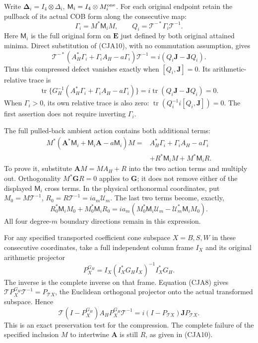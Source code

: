 \documentclass[11pt,a4paper]{article}
\begin{document}
Write \(\boldsymbol\Delta_i=I_4\otimes\Delta_i\),
\(\mathsf M_i=I_4\otimes M_i^{\rm one}\).
For each original endpoint retain the pullback of its actual COB form
along the consecutive map:
\[
 \Gamma_i=M^*\mathsf M_iM,\qquad
 Q_i=\mathcal T^{-*}\Gamma_i\mathcal T^{-1}.
\]
Here \(\mathsf M_i\) is the full original form on \(\mathbf E\)
just defined by both original attained minima.
Direct substitution of (CJA10), with no commutation assumption, gives
\begin{equation}
 \boxed{\mathcal T^{-*}
 (A_H^*\Gamma_i+\Gamma_iA_H-a\Gamma_i)\mathcal T^{-1}
       =i(Q_i\mathbf J-\mathbf JQ_i).}
 \tag{CJA13}
\end{equation}
Thus this compressed defect vanishes exactly when
\([Q_i,\mathbf J]=0\).
Its arithmetic-relative trace is
\[
 \operatorname{tr}\{G_H^{-1}
 (A_H^*\Gamma_i+\Gamma_iA_H-a\Gamma_i)\}
   =i\operatorname{tr}(Q_i\mathbf J-\mathbf JQ_i)=0 .
\]
When \(\Gamma_i>0\), its own relative trace is also zero:
\(\operatorname{tr}(Q_i^{-1}i[Q_i,\mathbf J])=0\).
The first assertion does not require inverting \(\Gamma_i\).

The full pulled-back ambient action contains both additional terms:
\begin{equation}
 \begin{split}
 M^*(\mathbf A^*\mathsf M_i+\mathsf M_i\mathbf A-a\mathsf M_i)M
 ={}&A_H^*\Gamma_i+\Gamma_iA_H-a\Gamma_i\\
   &+R^*\mathsf M_iM+M^*\mathsf M_iR .
 \end{split}
 \tag{CJA14}
\end{equation}
To prove it, substitute \(\mathbf AM=MA_H+R\) into the two
action terms and multiply out.  Orthogonality
\(M^*\mathbf GR=0\) applies to \(\mathbf G\);
it does not remove either of the displayed \(\mathsf M_i\) cross terms.
In the physical orthonormal coordinates, put
\(M_0=M\mathcal T^{-1}\), \(R_0=R\mathcal T^{-1}=ia_m\mathcal U_m\).
The last two terms become, exactly,
\begin{equation}
 R_0^*\mathsf M_iM_0+M_0^*\mathsf M_iR_0
 =ia_m(M_0^*\mathsf M_i\mathcal U_m
              -\mathcal U_m^*\mathsf M_iM_0).
 \tag{CJA15}
\end{equation}
All four degree-\(m\) boundary directions remain in this expression.

For any specified transported coefficient cone subspace \(X=B,S,W\)
in these consecutive coordinates,
take a full independent column frame \(I_X\) and its original
arithmetic projector
\[
 P_X^{G_H}=I_X(I_X^*G_HI_X)^{-1}I_X^*G_H .
\]
The inverse is the complete inverse on that frame.
Equation (CJA8) gives
\(\mathcal TP_X^{G_H}\mathcal T^{-1}=P_{\mathcal TX}\),
the Euclidean orthogonal projector onto the actual transformed
subspace.  Hence
\begin{equation}
 \mathcal T(I-P_X^{G_H})A_HP_X^{G_H}\mathcal T^{-1}
     =i(I-P_{\mathcal TX})\mathbf JP_{\mathcal TX}.
 \tag{CJA16}
\end{equation}
This is an exact preservation test for the compression.
The complete failure of the specified inclusion \(M\) to intertwine
\(\mathbf A\) is still \(R\), as given in (CJA10).
\end{document}
